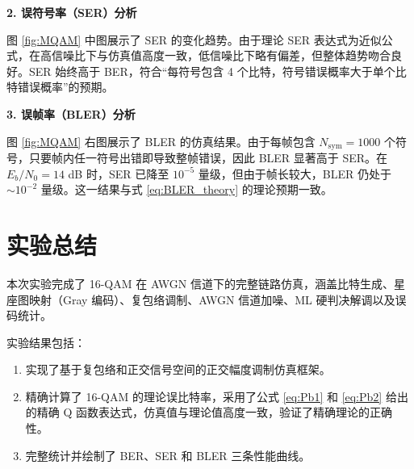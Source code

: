 \documentclass[UTF8]{ctexart}
\begin{document}
\textbf{2. 误符号率（SER）分析}

图 \ref{fig:MQAM} 中图展示了 SER 的变化趋势。由于理论 SER 表达式为近似公式，在高信噪比下与仿真值高度一致，低信噪比下略有偏差，但整体趋势吻合良好。SER 始终高于 BER，符合“每符号包含 4 个比特，符号错误概率大于单个比特错误概率”的预期。

\textbf{3. 误帧率（BLER）分析}

图 \ref{fig:MQAM} 右图展示了 BLER 的仿真结果。由于每帧包含 \(N_{\text{sym}} = 1000\) 个符号，只要帧内任一符号出错即导致整帧错误，因此 BLER 显著高于 SER。在 \(E_b/N_0 = 14\) dB 时，SER 已降至 \(10^{-5}\) 量级，但由于帧长较大，BLER 仍处于 \(\sim 10^{-2}\) 量级。这一结果与式 \eqref{eq:BLER_theory} 的理论预期一致。

\section{实验总结}

本次实验完成了 16-QAM 在 AWGN 信道下的完整链路仿真，涵盖比特生成、星座图映射（Gray 编码）、复包络调制、AWGN 信道加噪、ML 硬判决解调以及误码统计。

实验结果包括：
\begin{enumerate}
    \item 实现了基于复包络和正交信号空间的正交幅度调制仿真框架。
    \item 精确计算了 16-QAM 的理论误比特率，采用了公式 \eqref{eq:Pb1} 和 \eqref{eq:Pb2} 给出的精确 Q 函数表达式，仿真值与理论值高度一致，验证了精确理论的正确性。
    \item 完整统计并绘制了 BER、SER 和 BLER 三条性能曲线。
\end{enumerate}
\end{document}
